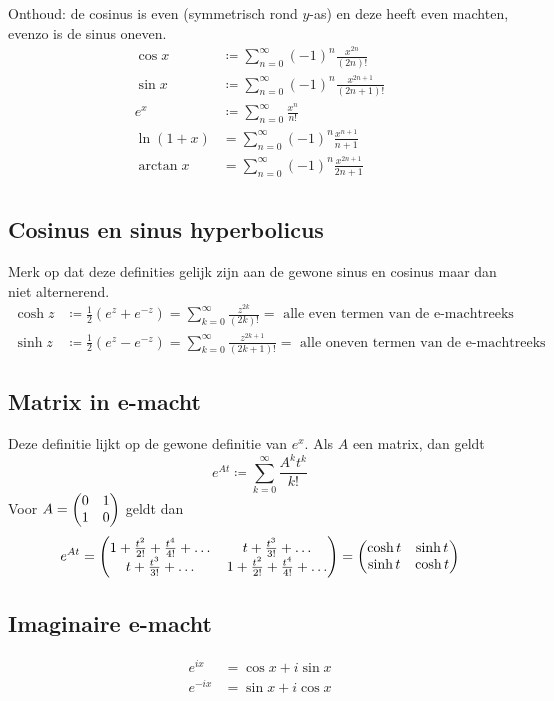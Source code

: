 \documentclass{article}
\begin{document}
	Onthoud: de cosinus is even (symmetrisch rond $y$-as) en deze heeft even machten, evenzo is de sinus oneven.
	\begin{align*}
		\cos x &\coloneqq \sum_{n=0}^\infty (-1)^n \frac{x^{2n}}{(2n)!} \\
		\sin x &\coloneqq \sum_{n=0}^\infty (-1)^n \frac{x^{2n+1}}{(2n+1)!} \\
		e^x &\coloneqq \sum_{n=0}^\infty \frac{x^n}{n!} \\
		\ln (1+x) &= \sum_{n=0}^\infty (-1)^{n} \frac{x^{n+1}}{n+1} \\
		\arctan x &= \sum_{n=0}^\infty (-1)^n \frac{x^{2n+1}}{2n+1} \\
	\end{align*}


	\subsection{Cosinus en sinus hyperbolicus}
		Merk op dat deze definities gelijk zijn aan de gewone sinus en cosinus maar dan niet alternerend.
		\begin{align*}
			\cosh z &\coloneqq \frac{1}{2} (e^z + e^{-z}) = \sum_{k=0}^\infty \frac{z^{2k}}{(2k)!} = \text{ alle even termen van de e-machtreeks} \\
			\sinh z &\coloneqq \frac{1}{2} (e^z - e^{-z}) = \sum_{k=0}^\infty \frac{z^{2k+1}}{(2k+1)!} = \text{ alle oneven termen van de e-machtreeks}
		\end{align*}
	\subsection{Matrix in e-macht}
		Deze definitie lijkt op de gewone definitie van $e^x$. Als $A$ een matrix, dan geldt
		\[ e^{At} \coloneqq \sum_{k=0}^\infty \frac{A^k t^k}{k!} \]
		Voor $\displaystyle A = \begin{pmatrix} 0 & 1 \\ 1 & 0 \end{pmatrix}$ geldt dan
		\[ e^{At} =
		\begin{pmatrix} 1 + \frac{t^2}{2!} + \frac{t^4}{4!} + \dots & t + \frac{t^3}{3!} + \dots \\
			t + \frac{t^3}{3!} + \dots & 1 + \frac{t^2}{2!} + \frac{t^4}{4!} + \dots \end{pmatrix}
		= \begin{pmatrix} \cosh t & \sinh t \\ \sinh t & \cosh t \end{pmatrix}\]

	\subsection{Imaginaire e-macht}

	\begin{align*}
		e^{ix} &= \cos x + i \sin x \\
		e^{-ix} &= \sin x + i \cos x
	\end{align*}
 		
\end{document}
